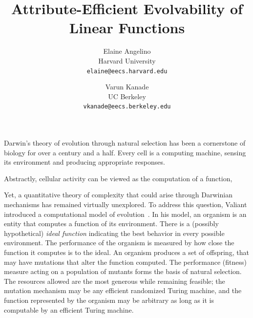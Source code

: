 \documentclass[11pt]{article}
\begin{document}
\title{Attribute-Efficient Evolvability of Linear Functions} 
\author{Elaine Angelino \\
Harvard University \\ \texttt{elaine@eecs.harvard.edu} \and Varun
Kanade \\ UC Berkeley \\ \texttt{vkanade@eecs.berkeley.edu}}

\maketitle

Darwin's theory of evolution through natural selection has been a cornerstone of
biology for over a century and a half. Every cell is a computing machine,
sensing its environment and producing appropriate responses.

Abstractly, cellular activity can be viewed as the computation of a function,
 

Yet, a quantitative theory of complexity
that could arise through Darwinian mechanisms has remained virtually unexplored.
To address this question, Valiant introduced a computational model of
evolution~\cite{Valiant:2009-evolvability}.  In his model, an organism is an
entity that computes a function of its environment.  There is a (possibly
hypothetical) \emph{ideal function} indicating the best behavior in every
possible environment. The performance of the organism is measured by how close
the function it computes is to the ideal. An organism produces a set of
offspring, that may have mutations that  alter the function computed. The
performance (fitness) measure acting on a population of mutants forms the basis
of natural selection. The resources allowed are the most generous while
remaining feasible; the mutation mechanism may be any efficient randomized
Turing machine, and the function represented by the organism may be arbitrary as
long as it is computable by an efficient Turing machine.
\end{document}
